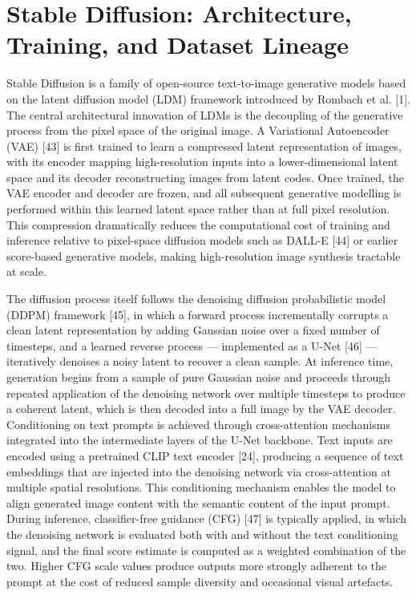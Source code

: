 

\section{Stable Diffusion: Architecture, Training, and Dataset Lineage}
Stable Diffusion is a family of open-source text-to-image generative models based on the latent diffusion model (LDM) framework introduced by Rombach et al. [1]. The central architectural innovation of LDMs is the decoupling of the generative process from the pixel space of the original image. A Variational Autoencoder (VAE) [43] is first trained to learn a compressed latent representation of images, with its encoder mapping high-resolution inputs into a lower-dimensional latent space and its decoder reconstructing images from latent codes. Once trained, the VAE encoder and decoder are frozen, and all subsequent generative modelling is performed within this learned latent space rather than at full pixel resolution. This compression dramatically reduces the computational cost of training and inference relative to pixel-space diffusion models such as DALL-E [44] or earlier score-based generative models, making high-resolution image synthesis tractable at scale.

The diffusion process itself follows the denoising diffusion probabilistic model (DDPM) framework [45], in which a forward process incrementally corrupts a clean latent representation by adding Gaussian noise over a fixed number of timesteps, and a learned reverse process — implemented as a U-Net [46] — iteratively denoises a noisy latent to recover a clean sample. At inference time, generation begins from a sample of pure Gaussian noise and proceeds through repeated application of the denoising network over multiple timesteps to produce a coherent latent, which is then decoded into a full image by the VAE decoder.
Conditioning on text prompts is achieved through cross-attention mechanisms integrated into the intermediate layers of the U-Net backbone. Text inputs are encoded using a pretrained CLIP text encoder [24], producing a sequence of text embeddings that are injected into the denoising network via cross-attention at multiple spatial resolutions. This conditioning mechanism enables the model to align generated image content with the semantic content of the input prompt. During inference, classifier-free guidance (CFG) [47] is typically applied, in which the denoising network is evaluated both with and without the text conditioning signal, and the final score estimate is computed as a weighted combination of the two. Higher CFG scale values produce outputs more strongly adherent to the prompt at the cost of reduced sample diversity and occasional visual artefacts.

